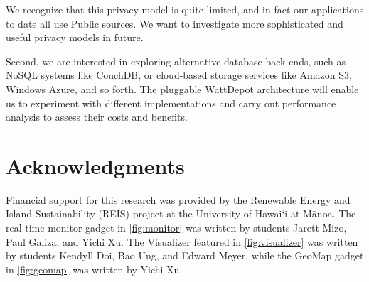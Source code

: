 \documentclass[conference]{IEEEtran}
\begin{document}
We recognize that this privacy model is quite limited, and in fact our
applications to date all use Public sources.  We want to investigate more
sophisticated and useful privacy models in future.

Second, we are interested in exploring alternative database back-ends, such
as NoSQL systems like CouchDB, or cloud-based storage services like Amazon
S3, Windows Azure, and so forth. The pluggable WattDepot architecture will
enable us to experiment with different implementations and carry out
performance analysis to assess their costs and benefits.

\section{Acknowledgments}

Financial support for this research was provided by the Renewable Energy and
Island Sustainability (REIS) project at the University of Hawai`i at M\=anoa.
The real-time monitor gadget in \figurename \ref{fig:monitor} was written by
students Jarett Mizo, Paul Galiza, and Yichi Xu. The Visualizer featured in
\figurename \ref{fig:visualizer} was written by students Kendyll Doi, Bao Ung,
and Edward Meyer, while the GeoMap gadget in \figurename \ref{fig:geomap}
was written by Yichi Xu.



\end{document}
